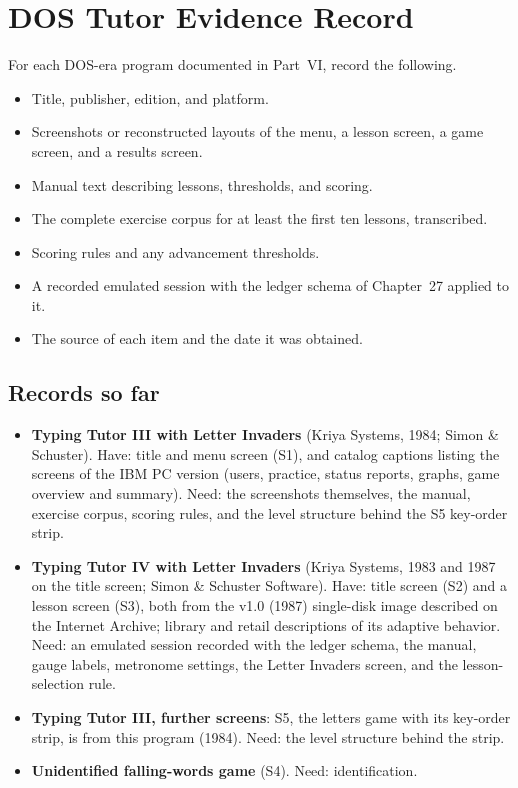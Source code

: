 \chapter{DOS Tutor Evidence Record}

For each DOS-era program documented in Part~VI, record the following.

\begin{itemize}
\item Title, publisher, edition, and platform.
\item Screenshots or reconstructed layouts of the menu, a lesson screen, a game screen, and a results screen.
\item Manual text describing lessons, thresholds, and scoring.
\item The complete exercise corpus for at least the first ten lessons, transcribed.
\item Scoring rules and any advancement thresholds.
\item A recorded emulated session with the ledger schema of Chapter~27 applied to it.
\item The source of each item and the date it was obtained.
\end{itemize}

\section*{Records so far}

\begin{itemize}
\item \textbf{Typing Tutor III with Letter Invaders} (Kriya Systems, 1984; Simon \& Schuster). Have: title and menu screen (S1), and catalog captions listing the screens of the IBM PC version (users, practice, status reports, graphs, game overview and summary). Need: the screenshots themselves, the manual, exercise corpus, scoring rules, and the level structure behind the S5 key-order strip.
\item \textbf{Typing Tutor IV with Letter Invaders} (Kriya Systems, 1983 and 1987 on the title screen; Simon \& Schuster Software). Have: title screen (S2) and a lesson screen (S3), both from the v1.0 (1987) single-disk image described on the Internet Archive; library and retail descriptions of its adaptive behavior. Need: an emulated session recorded with the ledger schema, the manual, gauge labels, metronome settings, the Letter Invaders screen, and the lesson-selection rule.
\item \textbf{Typing Tutor III, further screens}: S5, the letters game with its key-order strip, is from this program (1984). Need: the level structure behind the strip.
\item \textbf{Unidentified falling-words game} (S4). Need: identification.
\end{itemize}

